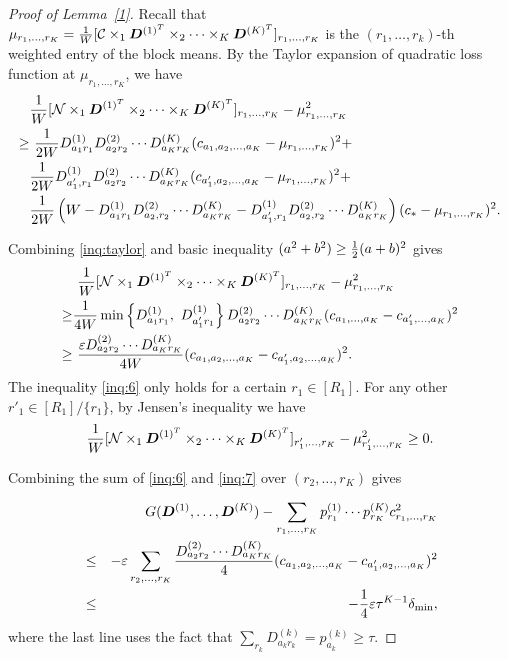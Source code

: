 \documentclass{article}
\begin{document}
\begin{appendices}
\begin{proof}[Proof of Lemma~\ref{1}]
Recall that $\mu_{r_1,\ldots,r_K} ={1\over W} [\mathcal{C}\times_1\bm{D}^{(1)^T}\times_2\cdots\times_K \bm{D}^{(K)^T}]_{r_1,\ldots,r_K}$ is the $(r_1,\ldots,r_k)$-th weighted entry of the block means. 
By the Taylor expansion of quadratic loss function at $\mu_{r_1,\ldots,r_K}$, we have
\begin{align}\label{inq:taylor}
&{1\over W} [\mathcal{N}\times_1\bm{D}^{(1)^T}\times_2\cdots \times_K\bm{D}^{(K)^T}]_{r_1,\ldots,r_K}-\mu^2_{r_1,\ldots,r_K}\notag \\
\geq &\ {1\over 2W} D_{a_1r_1}^{(1)}D_{a_2r_2}^{(2)}\cdots D_{a_Kr_K}^{(K)} (c_{a_1,a_2,\ldots,a_K}-\mu_{r_1,\ldots,r_K})^2+\notag \\
 &{1\over 2W} D_{a'_1,r_1}^{(1)}D_{a_2r_2}^{(2)}\cdots D_{a_Kr_K}^{(K)}(c_{a'_1,a_2,\ldots,a_K}-\mu_{r_1,\ldots,r_K})^2 +\notag \\
&\frac{1}{2W} \left(W-D_{a_1r_1}^{(1)}D_{a_2,r_2}^{(2)}\cdots D_{a_Kr_K}^{(K)}-D_{a'_1,r_1}^{(1)}D_{a_2,r_2}^{(2)}\cdots D_{a_Kr_K}^{(K)}\right)(c_*-\mu_{r_1,\ldots,r_K})^2.
\end{align}

Combining \eqref{inq:taylor} and  basic inequality $(a^2+b^2)\geq {1\over 2}(a+b)^2$ gives
\begin{align}\label{inq:6}
&\ {1\over W}[\tN\times_1\mD^{(1)^T}\times_2\cdots \times_K\mD^{(K)^T}]_{r_1,\ldots,r_K}-\mu_{r_1,\ldots,r_K}^2\notag \\
   \geq & \frac{1}{4W}\min\left\{D_{a_1r_1}^{(1)},\ D_{a_1'r_1}^{(1)}\right\}D_{a_2r_2}^{(2)}\cdots D_{a_Kr_K}^{(K)}(c_{a_1,\ldots,a_K}-c_{a_1',\ldots,a_K})^2\notag \\
   \geq &\ \frac{\varepsilon D_{a_2r_2}^{(2)}\cdots D_{a_Kr_K}^{(K)}}{4W}(c_{a_1,a_2,\ldots,a_K}-c_{a_1',a_2,\ldots,a_K})^2.
\end{align}
The inequality \eqref{inq:6} only holds for a certain $r_1\in[R_1]$. For any other $r'_1\in [R_1]/\{r_1\}$, by Jensen's inequality we have
\begin{equation} 
    \frac{1}{W}[\mathcal{N}\times_1\bm{D}^{(1)^T}\times_2\cdots \times_K\bm{D}^{(K)^T}]_{r'_1,\ldots,r_K}-\mu^2_{r'_1,\ldots,r_K} \geq 0.
    \label{inq:7}
\end{equation}


Combining the sum of \eqref{inq:6} and \eqref{inq:7} over $(r_2,\ldots,r_K)$ gives

\begin{eqnarray*}
&& G(\bm{D}^{(1)},\ldots,\bm{D}^{(K)})-\sum_{r_1,\ldots,r_K} p^{(1)}_{r_1} \cdots p^{(K)}_{r_K} c^2_{r_1,\ldots,r_K}    \\
&\leq& -\varepsilon\displaystyle\sum_{r_2,\ldots,r_K}\frac{D_{a_2r_2}^{(2)}\cdots D_{a_Kr_K}^{(K)}}{4}(c_{a_1,a_2,\ldots,a_K}-c_{a_1',a_2,\ldots,a_K})^2\\
&\leq& -\frac{1}{4}\varepsilon\tau^{K-1}\delta_{\min},
\end{eqnarray*}
where the last line uses the fact that $\displaystyle\sum_{r_k}D_{a_kr_k}^{(k)}=p_{a_k}^{(k)}\geq \tau$. 
\end{proof}


\end{appendices}
\end{document}
